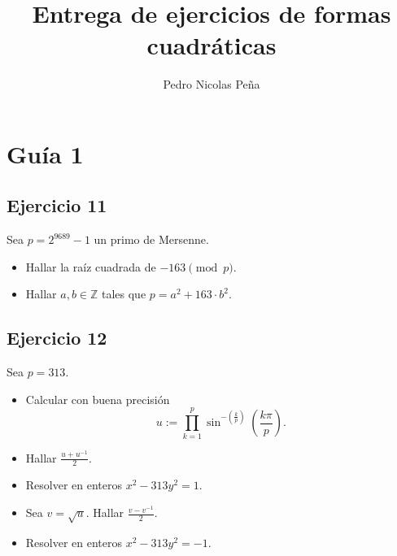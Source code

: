 \documentclass[12pt]{amsart}
\title{Entrega de ejercicios de formas cuadráticas}
\author{Pedro Nicolas Peña}
\newcommand{\ZZ}{\mathbb{Z}}
\newcommand{\lp}{\left(}
\newcommand{\rp}{\right)}
\theoremstyle{plain}
\begin{document}

\maketitle

\section*{Guía 1}





\subsection*{Ejercicio 11}
Sea $p = 2^{9689} - 1$ un primo de Mersenne.

\begin{multicols}{2}
\begin{itemize}
    \item Hallar la raíz cuadrada de $-163 \pmod{p}$.
    \item Hallar $a, b \in \ZZ$ tales que $p = a^2 + 163 \cdot 
    b^2$.
\end{itemize}
\end{multicols}

\subsection*{Ejercicio 12}
Sea $p = 313$.

\begin{multicols}{2}
\begin{itemize}
    \item Calcular con buena precisión
    $$u := \prod_{k=1}^{p} \sin^{-\lp \frac{k}{p}\rp} \lp 
    \frac{k\pi}{p} \rp.$$
    \item Hallar $\frac{u + u^{-1}}{2}$.
    \item Resolver en enteros $x^2 - 313y^2 = 1$.
    \item Sea $v = \sqrt{u}.$ Hallar $\frac{v - v^{-1}}{2}$.
    \item Resolver en enteros $x^2 - 313y^2 = -1$.
\end{itemize}
\end{multicols}
\end{document}
